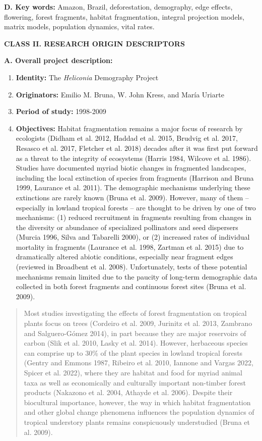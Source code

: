 \documentclass[
  12pt,
  man, donotrepeattitle,floatsintext]{apa6}
\begin{document}
\noindent
\textbf{D. Key words:} Amazon, Brazil, deforestation, demography, edge effects, flowering, forest fragments, habitat fragmentation, integral projection models, matrix models, population dynamics, vital rates.

\noindent 
\textbf{CLASS II. RESEARCH ORIGIN DESCRIPTORS}

\noindent  
\textbf{A. Overall project description:}

\begin{enumerate}
\def\labelenumi{\arabic{enumi}.}
\item
  \textbf{Identity:} The \emph{Heliconia} Demography Project
\item
  \textbf{Originators:} Emilio M. Bruna, W. John Kress, and María Uriarte
\item
  \textbf{Period of study:} 1998-2009
\item
  \textbf{Objectives:} Habitat fragmentation remains a major focus of research by ecologists (Didham et al. 2012, Haddad et al. 2015, Brudvig et al. 2017, Resasco et al. 2017, Fletcher et al. 2018) decades after it was first put forward as a threat to the integrity of ecosystems (Harris 1984, Wilcove et al. 1986). Studies have documented myriad biotic changes in fragmented landscapes, including the local extinction of species from fragments (Harrison and Bruna 1999, Laurance et al. 2011). The demographic mechanisms underlying these extinctions are rarely known (Bruna et al. 2009). However, many of them -- especially in lowland tropical forests -- are thought to be driven by one of two mechanisms: (1) reduced recruitment in fragments resulting from changes in the diversity or abundance of specialized pollinators and seed dispersers (Murcia 1996, Silva and Tabarelli 2000), or (2) increased rates of individual mortality in fragments (Laurance et al. 1998, Zartman et al. 2015) due to dramatically altered abiotic conditions, especially near fragment edges (reviewed in Broadbent et al. 2008). Unfortunately, tests of these potential mechanisms remain limited due to the paucity of long-term demographic data collected in both forest fragments and continuous forest sites (Bruna et al. 2009).
\end{enumerate}

\begin{quote}
Most studies investigating the effects of forest fragmentation on tropical plants focus on trees (Cordeiro et al. 2009, Jurinitz et al. 2013, Zambrano and Salguero-Gómez 2014), in part because they are major reservoirs of carbon (Slik et al. 2010, Lasky et al. 2014). However, herbaceous species can comprise up to 30\% of the plant species in lowland tropical forests (Gentry and Emmons 1987, Ribeiro et al. 2010, Iannone and Vargas 2022, Spicer et al. 2022), where they are habitat and food for myriad animal taxa as well as economically and culturally important non-timber forest products (Nakazono et al. 2004, Athayde et al. 2006). Despite their biocultural importance, however, the way in which habitat fragmentation and other global change phenomena influences the population dynamics of tropical understory plants remains conspicuously understudied (Bruna et al. 2009).
\end{quote}
\end{document}
